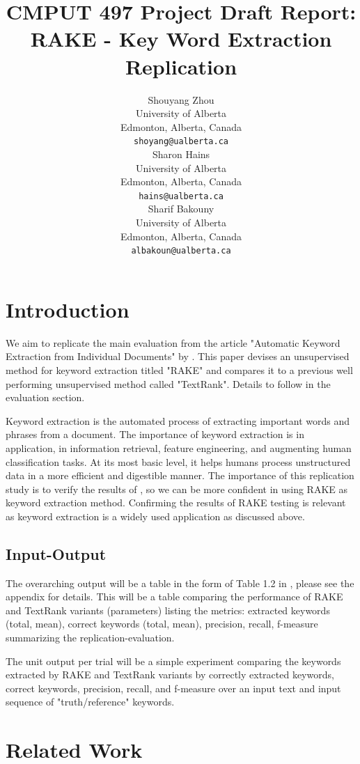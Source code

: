 \documentclass[11pt,a4paper]{article}
\title{CMPUT 497 Project Draft Report: \\ RAKE - Key Word Extraction Replication}
\author{Shouyang Zhou \\
  University of Alberta \\
  Edmonton, Alberta, Canada \\
  {\tt shoyang@ualberta.ca} \\\And
  Sharon Hains \\
  University of Alberta \\
  Edmonton, Alberta, Canada \\
  {\tt hains@ualberta.ca} \\\And
  Sharif Bakouny \\
  University of Alberta \\
  Edmonton, Alberta, Canada \\
  {\tt albakoun@ualberta.ca} \\}
\date{}
\begin{document}
\maketitle

\section{Introduction}

We aim to replicate the main evaluation from the article "Automatic Keyword Extraction from Individual Documents" by \citet{1}. This paper devises an unsupervised method for keyword extraction titled "RAKE" and compares it to a previous well performing unsupervised method called "TextRank". Details to follow in the evaluation section.

Keyword extraction is the automated process of extracting important words and phrases from a document. The importance of keyword extraction is in application, in information retrieval, feature engineering, and augmenting human classification tasks. At its most basic level, it helps humans process unstructured data in a more efficient and digestible manner. The importance of this replication study is to verify the results of \citet{1}, so we can be more confident in using RAKE as keyword extraction method. Confirming the results of RAKE testing is relevant as keyword extraction is a widely used application as discussed above. 

\subsection{Input-Output}

The overarching output will be a table in the form of Table 1.2 in \citet{1}, please see the appendix for details. This will be a table comparing the performance of RAKE and TextRank variants (parameters) listing the metrics: extracted keywords (total, mean), correct keywords (total, mean), precision, recall, f-measure summarizing the replication-evaluation.

The unit output per trial will be a simple experiment comparing the keywords extracted by RAKE and TextRank variants by correctly extracted keywords, correct keywords, precision, recall, and f-measure over an input text and input sequence of "truth/reference" keywords. 

\section{Related Work}
\end{document}
